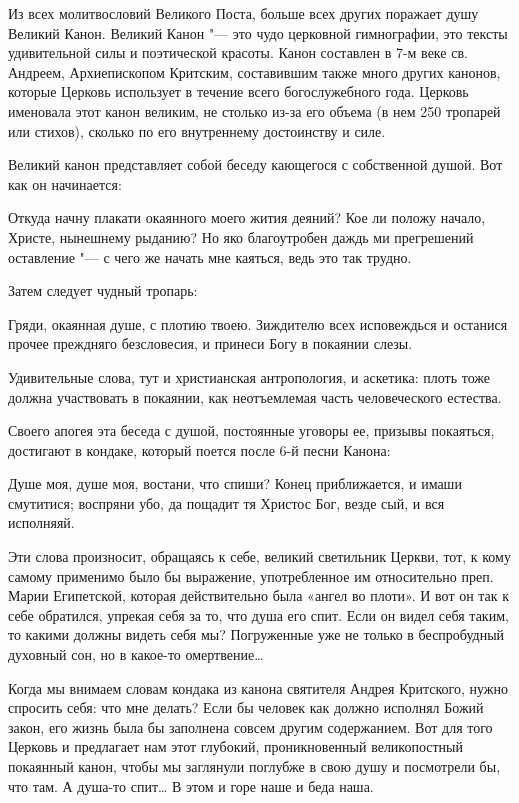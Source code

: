 \begin{mymulticols}
Из всех молитвословий Великого Поста, больше всех других поражает душу Великий Канон. Великий Канон "--- это чудо церковной гимнографии, это тексты удивительной силы и поэтической красоты. Канон составлен в 7-м веке св. Андреем, Архиепископом Критским, составившим также много других канонов, которые Церковь использует в течение всего богослужебного года. Церковь именовала этот канон великим, не столько из-за его объема (в нем 250 тропарей или стихов), сколько по его внутреннему достоинству и силе.

Великий канон представляет собой беседу кающегося с собственной душой. Вот как он начинается:

Откуда начну плакати окаянного моего жития деяний? Кое ли положу начало, Христе, нынешнему рыданию? Но яко благоутробен даждь ми прегрешений оставление "--- с чего же начать мне каяться, ведь это так трудно.

Затем следует чудный тропарь:

Гряди, окаянная душе, с плотию твоею. Зиждителю всех исповеждься и останися прочее преждняго безсловесия, и принеси Богу в покаянии слезы.

Удивительные слова, тут и христианская антропология, и аскетика: плоть тоже должна участвовать в покаянии, как неотъемлемая часть человеческого естества.

Своего апогея эта беседа с душой, постоянные уговоры ее, призывы покаяться, достигают в кондаке, который поется после 6-й песни Канона:

Душе моя, душе моя, востани, что спиши? Конец приближается, и имаши смутитися; воспряни убо, да пощадит тя Христос Бог, везде сый, и вся исполняяй.

Эти слова произносит, обращаясь к себе, великий светильник Церкви, тот, к кому самому применимо было бы выражение, употребленное им относительно преп. Марии Египетской, которая действительно была «ангел во плоти». И вот он так к себе обратился, упрекая себя за то, что душа его спит. Если он видел себя таким, то какими должны видеть себя мы? Погруженные уже не только в беспробудный духовный сон, но в какое-то омертвение…

Когда мы внимаем словам кондака из канона святителя Андрея Критского, нужно спросить себя: что мне делать? Если бы человек как должно исполнял Божий закон, его жизнь была бы заполнена совсем другим содержанием. Вот для того Церковь и предлагает нам этот глубокий, проникновенный великопостный покаянный канон, чтобы мы заглянули поглубже в свою душу и посмотрели бы, что там. А душа-то спит… В этом и горе наше и беда наша.


\end{mymulticols}
